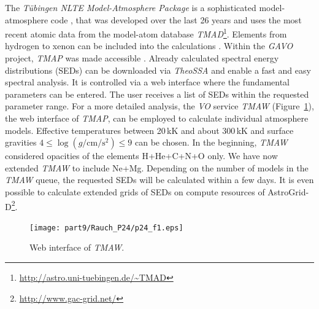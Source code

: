 The \emph{T\"ubingen NLTE Model-Atmosphere Package} \citep[\emph{TMAP},][]{werneretal2003, rauchdeetjen2003} is a sophisticated model-atmosphere code \citep[e.g\@.][]{rauchetal2007}, that was developed over the last 26 years and uses the most recent atomic data from the model-atom database \emph{TMAD}\footnote[1]{\url{http://astro.uni-tuebingen.de/~TMAD}}. Elements from hydrogen to xenon can be included into the calculations \citep{rauch2003,werneretal2012,rauchetal2012}. Within the \emph{GAVO} project, \emph{TMAP} was made accessible \citep{rauchringat2011}. Already calculated spectral energy distributions (SEDs) can be downloaded via \emph{TheoSSA} and enable a fast and easy spectral analysis. It is controlled via a web interface where the fundamental parameters can be entered. The user receives a list of SEDs within the requested parameter range. For a more detailed analysis, the \emph{VO} service \emph{TMAW} (Figure~\ref{fig:tmaw}), the web interface of \emph{TMAP}, can be employed to calculate individual atmosphere models. Effective temperatures between 20\,kK and about 300\,kK and surface gravities $4 \leq \log (g / \mathrm{cm/s^2}) \leq 9$ can be chosen. In the beginning,  \emph{TMAW} considered opacities of the elements H+He+C+N+O only. We have now extended \emph{TMAW} to include Ne+Mg. Depending on the number of models in the \emph{TMAW} queue, the requested SEDs will be calculated within a few days. It is even possible to calculate extended grids of SEDs on compute resources of AstroGrid-D\footnote[2]{\url{http://www.gac-grid.net/}}.


\begin{landscape}
\begin{figure}[ht!]\centering
\texttt{[image: part9/Rauch\_P24/p24\_f1.eps]}
\caption{Web interface of \emph{TMAW}.}
\label{fig:tmaw}
\end{figure}
\end{landscape}


